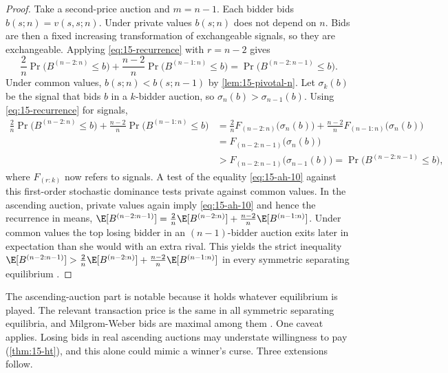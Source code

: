 \begin{proof}
Take a second-price auction and $m=n-1$. Each bidder bids $b(s;n)=v(s,s;n)$. Under private values $b(s;n)$
does not depend on $n$. Bids are then a fixed increasing transformation of exchangeable signals, so they are
exchangeable. Applying \eqref{eq:15-recurrence} with $r=n-2$ gives
\begin{equation}\label{eq:15-ah-10}
  \frac2n\Pr\bigl(B^{(n-2:n)}\le b\bigr)+\frac{n-2}{n}\Pr\bigl(B^{(n-1:n)}\le b\bigr)=\Pr\bigl(B^{(n-2:n-1)}\le b\bigr).
\end{equation}
Under common values, $b(s;n)<b(s;n-1)$ by \cref{lem:15-pivotal-n}. Let $\sigma_k(b)$ be the signal that bids
$b$ in a $k$-bidder auction, so $\sigma_n(b)>\sigma_{n-1}(b)$. Using \eqref{eq:15-recurrence} for signals,
\begin{align*}
  \frac2n\Pr\bigl(B^{(n-2:n)}\le b\bigr)+\frac{n-2}{n}\Pr\bigl(B^{(n-1:n)}\le b\bigr)
  &=\frac2nF_{(n-2:n)}\bigl(\sigma_n(b)\bigr)+\frac{n-2}{n}F_{(n-1:n)}\bigl(\sigma_n(b)\bigr)\\
  &=F_{(n-2:n-1)}\bigl(\sigma_n(b)\bigr)\\
  &>F_{(n-2:n-1)}\bigl(\sigma_{n-1}(b)\bigr)=\Pr\bigl(B^{(n-2:n-1)}\le b\bigr),
\end{align*}
where $F_{(r:k)}$ now refers to signals. A test of the equality \eqref{eq:15-ah-10} against this first-order
stochastic dominance tests private against common values. In the ascending auction, private values again
imply \eqref{eq:15-ah-10} and hence the recurrence in means,
$\E[B^{(n-2:n-1)}]=\frac2n\E[B^{(n-2:n)}]+\frac{n-2}{n}\E[B^{(n-1:n)}]$. Under common values the top losing
bidder in an $(n-1)$-bidder auction exits later in expectation than she would with an extra rival. This yields
the strict inequality $\E[B^{(n-2:n-1)}]>\frac2n\E[B^{(n-2:n)}]+\frac{n-2}{n}\E[B^{(n-1:n)}]$ in every symmetric
separating equilibrium \citep[eqs.~(13)--(17)]{AtheyHaile2002}.
\end{proof}

The ascending-auction part is notable because it holds whatever equilibrium is played. The relevant
transaction price is the same in all symmetric separating equilibria, and Milgrom-Weber bids are maximal among
them \citep{BikhchandaniHaileRiley2002}. One caveat applies. Losing bids in real ascending auctions may
understate willingness to pay (\cref{thm:15-ht}), and this alone could mimic a winner's curse. Three
extensions follow.

